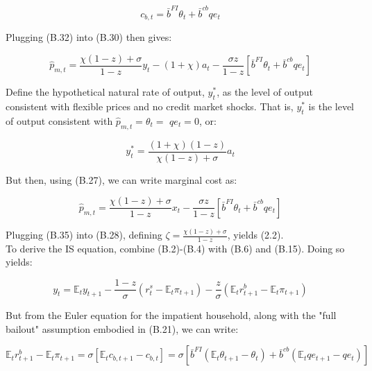 \documentclass[10pt]{article}
\begin{document}
\begin{equation*}
c_{b, t}=\bar{b}^{F I} \theta_{t}+\bar{b}^{c b} q e_{t} \tag{B.32}
\end{equation*}

Plugging (B.32) into (B.30) then gives:

\begin{equation*}
\widehat{p}_{m, t}=\frac{\chi(1-z)+\sigma}{1-z} y_{t}-(1+\chi) a_{t}-\frac{\sigma z}{1-z}\left[\bar{b}^{F I} \theta_{t}+\bar{b}^{c b} q e_{t}\right] \tag{B.33}
\end{equation*}

Define the hypothetical natural rate of output, $y_{t}^{*}$, as the level of output consistent with flexible prices and no credit market shocks. That is, $y_{t}^{*}$ is the level of output consistent with $\widehat{p}_{m, t}=\theta_{t}=$ $q e_{t}=0$, or:

\begin{equation*}
y_{t}^{*}=\frac{(1+\chi)(1-z)}{\chi(1-z)+\sigma} a_{t} \tag{B.34}
\end{equation*}

But then, using (B.27), we can write marginal cost as:

\begin{equation*}
\widehat{p}_{m, t}=\frac{\chi(1-z)+\sigma}{1-z} x_{t}-\frac{\sigma z}{1-z}\left[\bar{b}^{F I} \theta_{t}+\bar{b}^{c b} q e_{t}\right] \tag{B.35}
\end{equation*}

Plugging (B.35) into (B.28), defining $\zeta=\frac{\chi(1-z)+\sigma}{1-z}$, yields (2.2).\\
To derive the IS equation, combine (B.2)-(B.4) with (B.6) and (B.15). Doing so yields:

\begin{equation*}
y_{t}=\mathbb{E}_{t} y_{t+1}-\frac{1-z}{\sigma}\left(r_{t}^{s}-\mathbb{E}_{t} \pi_{t+1}\right)-\frac{z}{\sigma}\left(\mathbb{E}_{t} r_{t+1}^{b}-\mathbb{E}_{t} \pi_{t+1}\right) \tag{B.36}
\end{equation*}

But from the Euler equation for the impatient household, along with the "full bailout" assumption embodied in (B.21), we can write:

\begin{equation*}
\mathbb{E}_{t} r_{t+1}^{b}-\mathbb{E}_{t} \pi_{t+1}=\sigma\left[\mathbb{E}_{t} c_{b, t+1}-c_{b, t}\right]=\sigma\left[\bar{b}^{F I}\left(\mathbb{E}_{t} \theta_{t+1}-\theta_{t}\right)+\bar{b}^{c b}\left(\mathbb{E}_{t} q e_{t+1}-q e_{t}\right)\right] \tag{B.37}
\end{equation*}
\end{document}

